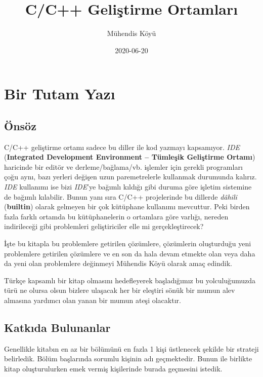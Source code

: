 \documentclass[
]{book}
\title{C/C++ Geliştirme Ortamları}
\author{Mühendis Köyü}
\date{2020-06-20}
\begin{document}
\maketitle

{
\setcounter{tocdepth}{1}
\tableofcontents
}
\hypertarget{bir-tutam-yazux131}{%
\chapter*{Bir Tutam Yazı}\label{bir-tutam-yazux131}}

\hypertarget{uxf6nsuxf6z}{%
\section*{Önsöz}\label{uxf6nsuxf6z}}

C/C++ geliştirme ortamı sadece bu diller ile kod yazmayı kapsamıyor. \emph{IDE} (\textbf{Integrated Development Environment -- Tümleşik Geliştirme Ortamı}) haricinde bir editör ve derleme/bağlama/vb. işlemler için gerekli programları çoğu aynı, bazı yerleri değişen uzun paremetrelerle kullanmak durumunda kalırız. \emph{IDE} kullanımı ise bizi \emph{IDE}'ye bağımlı kıldığı gibi duruma göre işletim sistemine de bağımlı kılabilir. Bunun yanı sıra C/C++ projelerinde bu dillerde \emph{dâhili} (\textbf{builtin}) olarak gelmeyen bir çok kütüphane kullanımı mevcuttur. Peki birden fazla farklı ortamda bu kütüphanelerin o ortamlara göre varlığı, nereden indirileceği gibi problemleri geliştiriciler elle mi gerçekleştirecek?

İşte bu kitapla bu problemlere getirilen çözümlere, çözümlerin oluşturduğu yeni problemlere getirilen çözümlere ve en son da hala devam etmekte olan veya daha da yeni olan problemlere değinmeyi Mühendis Köyü olarak amaç edindik.

Türkçe kapsamlı bir kitap olmasını hedefleyerek başladığımız bu yolculuğumuzda türü ne olursa olsun bizlere ulaşacak her bir eleştiri sönük bir mumun alev almasına yardımcı olan yanan bir mumun ateşi olacaktır.

\hypertarget{katkux131da-bulunanlar}{%
\section*{Katkıda Bulunanlar}\label{katkux131da-bulunanlar}}

Genellikle kitabın en az bir bölümünü en fazla 1 kişi üstlenecek şekilde bir strateji belirledik. Bölüm başlarında sorumlu kişinin adı geçmektedir. Bunun ile birlikte kitap oluşturulurken emek vermiş kişilerinde burada geçmesini istedik.
\end{document}
